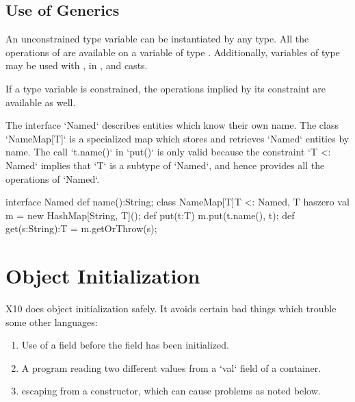 \subsection{Use of Generics}

An unconstrained type variable  can be instantiated by any type. All
the operations of  are available on a 
variable of type . Additionally, variables of type
 may be used with \Xcd{==, !=}, in , and casts.  

If a type variable is constrained, the operations implied by its constraint
are available as well.

\begin{ex}
The interface \xcd`Named` describes entities which know their own name.  The
class \xcd`NameMap[T]` is a specialized map which stores and retrieves
\xcd`Named` entities by name.  The call \xcd`t.name()` in \xcd`put()` is only
valid because the constraint \xcd`{T <: Named}` implies that \xcd`T` is a
subtype of \xcd`Named`, and hence provides all the operations of \xcd`Named`. 
\begin{xten}
interface Named { def name():String; }
class NameMap[T]{T <: Named, T haszero} {
   val m = new HashMap[String, T]();
   def put(t:T) { m.put(t.name(), t); }
   def get(s:String):T = m.getOrThrow(s);
}
\end{xten}
%


\end{ex}





\section{Object Initialization}
\label{ObjectInitialization}


X10 does object initialization safely.  It avoids certain bad things which
trouble some other languages:
\begin{enumerate}
\item Use of a field before the field has been initialized.
\item A program reading two different values from a \xcd`val` field of a
      container. 
\item {} escaping from a constructor, which can cause problems as
      noted below. 

\end{enumerate}

